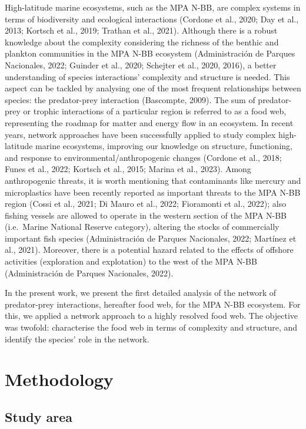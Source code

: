 \documentclass[preprint, 3p,
authoryear]{elsarticle} %
\begin{document}
High-latitude marine ecosystems, such as the MPA N-BB, are complex
systems in terms of biodiversity and ecological interactions (Cordone et
al., 2020; Day et al., 2013; Kortsch et al., 2019; Trathan et al.,
2021). Although there is a robust knowledge about the complexity
considering the richness of the benthic and plankton communities in the
MPA N-BB ecosystem (Administración de Parques Nacionales, 2022; Guinder
et al., 2020; Schejter et al., 2020, 2016), a better understanding of
species interactions' complexity and structure is needed. This aspect
can be tackled by analysing one of the most frequent relationships
between species: the predator-prey interaction (Bascompte, 2009). The
sum of predator-prey or trophic interactions of a particular region is
referred to as a food web, representing the roadmap for matter and
energy flow in an ecosystem. In recent years, network approaches have
been successfully applied to study complex high-latitude marine
ecosystems, improving our knowledge on structure, functioning, and
response to environmental/anthropogenic changes (Cordone et al., 2018;
Funes et al., 2022; Kortsch et al., 2015; Marina et al., 2023). Among
anthropogenic threats, it is worth mentioning that contaminants like
mercury and microplastics have been recently reported as important
threats to the MPA N-BB region (Cossi et al., 2021; Di Mauro et al.,
2022; Fioramonti et al., 2022); also fishing vessels are allowed to
operate in the western section of the MPA N-BB (i.e.~Marine National
Reserve category), altering the stocks of commercially important fish
species (Administración de Parques Nacionales, 2022; Martínez et al.,
2021). Moreover, there is a potential hazard related to the effects of
offshore activities (exploration and explotation) to the west of the MPA
N-BB (Administración de Parques Nacionales, 2022).

In the present work, we present the first detailed analysis of the
network of predator-prey interactions, hereafter food web, for the MPA
N-BB ecosystem. For this, we applied a network approach to a highly
resolved food web. The objective was twofold: characterise the food web
in terms of complexity and structure, and identify the species' role in
the network.

\hypertarget{methodology}{%
\section{Methodology}\label{methodology}}

\hypertarget{study-area}{%
\subsection{Study area}\label{study-area}}
\end{document}

